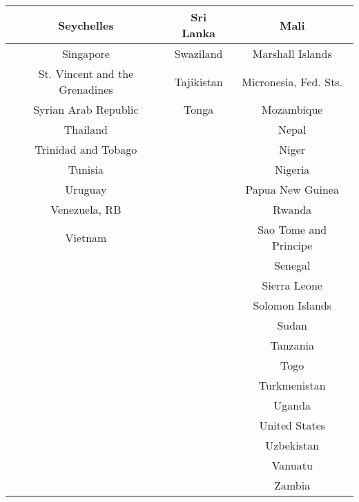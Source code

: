 \begin{center}
\begin{longtable}{|c|c|c|}
Seychelles&Sri Lanka&Mali\\
\hline
Singapore&Swaziland&Marshall Islands\\
\hline
St. Vincent and the Grenadines&Tajikistan&Micronesia, Fed. Sts.\\
\hline
Syrian Arab Republic&Tonga&Mozambique\\
\hline
Thailand&&Nepal\\
\hline
Trinidad and Tobago&&Niger\\
\hline
Tunisia&&Nigeria\\
\hline
Uruguay&&Papua New Guinea\\
\hline
Venezuela, RB&&Rwanda\\
\hline
Vietnam&&Sao Tome and Principe\\
\hline
&&Senegal\\
\hline
&&Sierra Leone\\
\hline
&&Solomon Islands\\
\hline
&&Sudan\\
\hline
&&Tanzania\\
\hline
&&Togo\\
\hline
&&Turkmenistan\\
\hline
&&Uganda\\
\hline
&&United States\\
\hline
&&Uzbekistan\\
\hline
&&Vanuatu\\
\hline
&&Zambia\\
\hline
\end{longtable}
\end{center}
